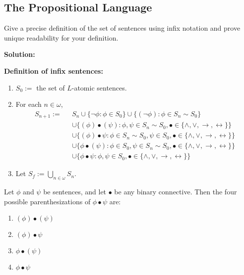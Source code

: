 \subsection{The Propositional Language}

\begin{tcolorbox}[title=Problem 10, breakable]
    Give a precise definition of the set of sentences using infix
    notation and prove unique readability for your definition.
\end{tcolorbox}

\textbf{Solution:}

\textbf{Definition of infix sentences:}
\begin{enumerate}
    \item $S_0 :=$ the set of $L$-atomic sentences.
    \item For each $n \in \omega$,
          \begin{align*}
            S_{n + 1} :=\text{ }&S_n \cup \{\neg \phi : \phi \in S_0\} 
                              \cup \{(\neg \phi) : \phi \in S_n \sim S_0\} \\
                         &\cup \{(\phi) \bullet (\psi): \phi, \psi \in S_n \sim S_0, \bullet \in \{\wedge, \vee, \rightarrow, \leftrightarrow\}\} \\
                         &\cup \{(\phi) \bullet \psi: \phi \in S_n \sim S_0, \psi \in S_0, \bullet \in \{\wedge, \vee, \rightarrow, \leftrightarrow\}\} \\
                         &\cup \{\phi \bullet (\psi): \phi \in S_0, \psi \in S_n \sim S_0, \bullet \in \{\wedge, \vee, \rightarrow, \leftrightarrow\}\} \\
                         &\cup \{\phi \bullet \psi: \phi, \psi \in S_0, \bullet \in \{\wedge, \vee, \rightarrow, \leftrightarrow\}\}
          \end{align*}
    \item Let $S_f := \bigcup_{n \in \omega} S_n$.
\end{enumerate}

\begin{definition}\label{def:parenth}
Let $\phi$ and $\psi$ be sentences, and let $\bullet$ be any binary connective. Then the four possible parenthesizations of $\phi \bullet \psi$ are:
\begin{enumerate}
    \item $(\phi) \bullet (\psi)$
    \item $(\phi) \bullet \psi$
    \item $\phi \bullet (\psi)$
    \item $\phi \bullet \psi$
\end{enumerate}
\end{definition}

